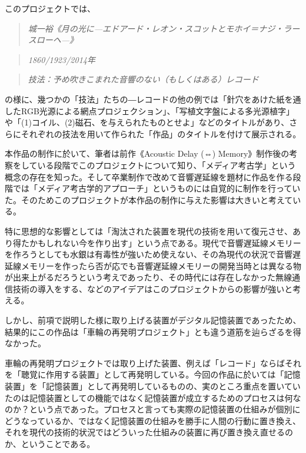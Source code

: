 \documentclass[a4paper,report]{jsbook}
\begin{document}
このプロジェクトでは、

\begin{quote}
\emph{城一裕《月の光に---エドアード・レオン・スコットとモホイ＝ナジ・ラースローヘ---》}
\end{quote}

\begin{quote}
\emph{1860/1923/2014年}
\end{quote}

\begin{quote}
\emph{技法：予め吹きこまれた音響のない（もしくはある）レコード}
\end{quote}

の様に、幾つかの「技法」たちの―レコードの他の例では「針穴をあけた紙を通したRGB光源による網点プロジェクション」、「写植文字盤による多光源植字」や「(1)コイル、(2)磁石、を与えられたものとせよ」などのタイトルがあり、さらにそれぞれの技法を用いて作られた「作品」のタイトルを付けて展示される。

本作品の制作に於いて、筆者は前作《Acoustic Delay (⇔)
Memory》制作後の考察をしている段階でこのプロジェクトについて知り、「メディア考古学」という概念の存在を知った。そして卒業制作で改めて音響遅延線を題材に作品を作る段階では「メディア考古学的アプローチ」というものには自覚的に制作を行っていた。そのためこのプロジェクトが本作品の制作に与えた影響は大きいと考えている。

特に思想的な影響としては「淘汰された装置を現代の技術を用いて復元させ、あり得たかもしれない今を作り出す」という点である。現代で音響遅延線メモリーを作ろうとしても水銀は有毒性が強いため使えない、その為現代の状況で音響遅延線メモリーを作ったら否が応でも音響遅延線メモリーの開発当時とは異なる物が出来上がるだろうという考えであったり、その時代には存在しなかった無線通信技術の導入をする、などのアイデアはこのプロジェクトからの影響が強いと考える。

しかし、前項で説明した様に取り上げる装置がデジタル記憶装置であったため、結果的にこの作品は「車輪の再発明プロジェクト」とも違う道筋を辿らざるを得なかった。

車輪の再発明プロジェクトでは取り上げた装置、例えば「レコード」ならばそれを「聴覚に作用する装置」として再発明している。今回の作品に於いては「記憶装置」を「記憶装置」として再発明しているものの、実のところ重点を置いていたのは記憶装置としての機能ではなく記憶装置が成立するためのプロセスは何なのか？という点であった。プロセスと言っても実際の記憶装置の仕組みが個別にどうなっているか、ではなく記憶装置の仕組みを勝手に人間の行動に置き換え、それを現代の技術的状況ではどういった仕組みの装置に再び置き換え直せるのか、ということである。
\end{document}
